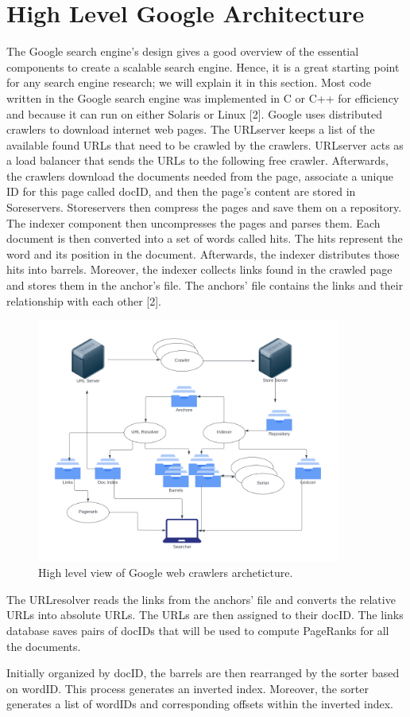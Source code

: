 \section{High Level Google Architecture}\label{sec:high-level-google-architecture}

The Google search engine's design gives a good overview of the essential components to create a scalable search engine. Hence, it is a great starting point for any search engine research; we will explain it in this section. Most code written in the Google search engine was implemented in C or C++ for efficiency and because it can run on either Solaris or Linux [2]. Google uses distributed crawlers to download internet web pages. The URLserver keeps a list of the available found URLs that need to be crawled by the crawlers. URLserver acts as a load balancer that sends the URLs to the following free crawler. Afterwards, the crawlers download the documents needed from the page, associate a unique ID for this page called docID, and then the page's content are stored in Soreservers. Storeservers then compress the pages and save them on a repository. The indexer component then uncompresses the pages and parses them. Each document is then converted into a set of words called hits. The hits represent the word and its position in the document. Afterwards, the indexer distributes those hits into barrels. Moreover, the indexer collects links found in the crawled page and stores them in the anchor's file. The anchors' file contains the links and their relationship with each other [2].


\begin{figure}[h]	
     \centering
     \includegraphics[width=10cm]{images/google_arch.png}
     \caption{High level view of Google web crawlers archeticture.}
     \label{fig:google-arch}
\end{figure}

The URLresolver reads the links from the anchors' file and converts the relative URLs into absolute URLs. The URLs are then assigned to their docID. The links database saves pairs of docIDs that will be used to compute PageRanks for all the documents. 

Initially organized by docID, the barrels are then rearranged by the sorter based on wordID. This process generates an inverted index. Moreover, the sorter generates a list of wordIDs and corresponding offsets within the inverted index. 
